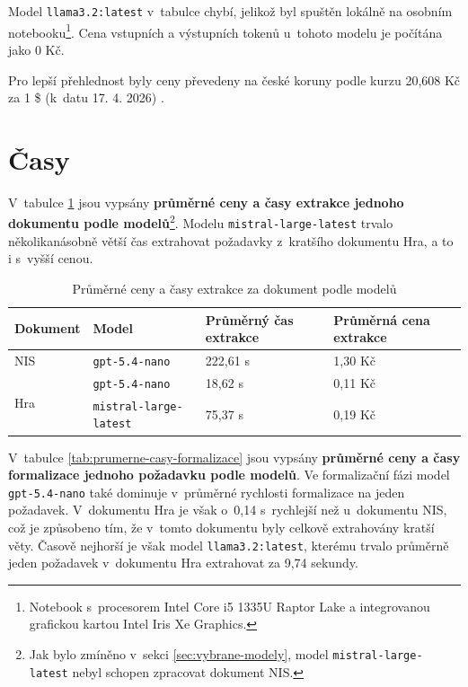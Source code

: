 \documentclass[czech, bc, kiv, he, iso690numb, pdf]{fasthesis}
\begin{document}
Model \verb"llama3.2:latest" v~tabulce chybí, jelikož byl spuštěn lokálně na osobním notebooku\footnote{Notebook s~procesorem Intel Core i5 1335U Raptor Lake a integrovanou grafickou kartou Intel Iris Xe Graphics.}. Cena vstupních a výstupních tokenů u~tohoto modelu je počítána jako 0 Kč.

Pro lepší přehlednost byly ceny převedeny na české koruny podle kurzu 20,608 Kč za 1 \$ (k~datu 17. 4. 2026) \cite{kurz}.

\section{Časy}\label{sec:vyhodnoceni-srovnani-casu}
V~tabulce \ref{tab:prumerne-casy-extrakce} jsou vypsány \textbf{průměrné ceny a časy extrakce jednoho dokumentu podle modelů}\footnote{Jak bylo zmíněno v~sekci \ref{sec:vybrane-modely}, model \verb"mistral-large-latest" nebyl schopen zpracovat dokument NIS.}. Modelu \verb"mistral-large-latest" trvalo několikanásobně větší čas extrahovat požadavky z~kratšího dokumentu Hra, a to i s~vyšší cenou.

\begin{table}[h!]
\centering
\caption{Průměrné ceny a časy extrakce za dokument podle modelů}
\label{tab:prumerne-casy-extrakce}
\begin{tabularx}{\textwidth}{llXX}
\hline\hline
\textbf{Dokument} & \textbf{Model} & \textbf{Průměrný čas extrakce} & \textbf{Průměrná cena extrakce} \\
\hline
NIS & \texttt{gpt-5.4-nano}     & 222,61 s~& 1,30 Kč \\
\midrule
\multirow{2}{*}{Hra}             & \texttt{gpt-5.4-nano}     &  18,62 s~& 0,11 Kč \\
                                & \texttt{mistral-large-latest} &  75,37 s~& 0,19 Kč\\
\hline\hline
\end{tabularx}
\end{table}

V~tabulce \ref{tab:prumerne-casy-formalizace} jsou vypsány \textbf{průměrné ceny a časy formalizace jednoho požadavku podle modelů}. Ve formalizační fázi model \verb"gpt-5.4-nano" také dominuje v~průměrné rychlosti formalizace na jeden požadavek. V~dokumentu Hra je však o~0,14 s~rychlejší než u~dokumentu NIS, což je způsobeno tím, že v~tomto dokumentu byly celkově extrahovány kratší věty. Časově nejhorší je však model \verb"llama3.2:latest", kterému trvalo průměrně jeden požadavek v~dokumentu Hra extrahovat za 9,74 sekundy.
\end{document}

